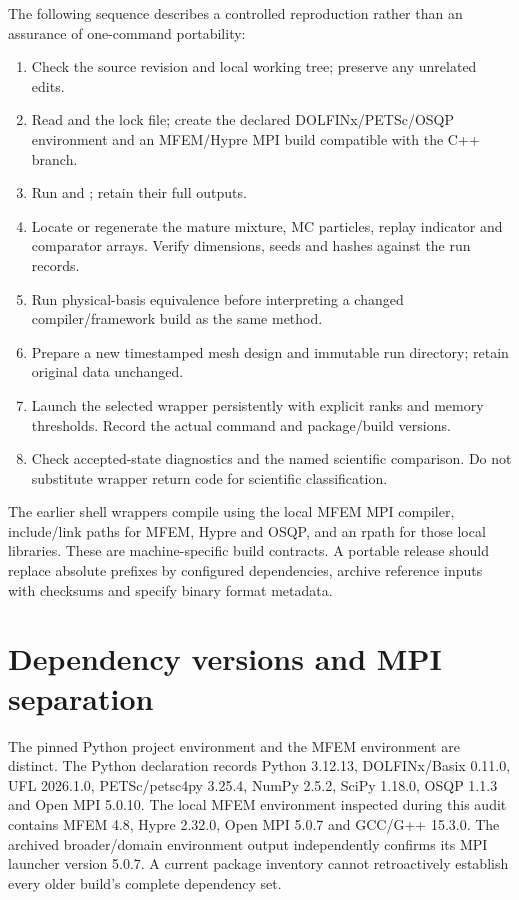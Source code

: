The following sequence describes a controlled reproduction rather than an assurance of one-command portability:
\begin{enumerate}
\item Check the source revision and local working tree; preserve any unrelated edits.
\item Read  and the lock file; create the declared DOLFINx/PETSc/OSQP environment and an MFEM/Hypre MPI build compatible with the C++ branch.
\item Run  and ; retain their full outputs.
\item Locate or regenerate the mature mixture, MC particles, replay indicator and comparator arrays. Verify dimensions, seeds and hashes against the run records.
\item Run physical-basis equivalence before interpreting a changed compiler/framework build as the same method.
\item Prepare a new timestamped mesh design and immutable run directory; retain original data unchanged.
\item Launch the selected wrapper persistently with explicit ranks and memory thresholds. Record the actual command and package/build versions.
\item Check accepted-state diagnostics and the named scientific comparison. Do not substitute wrapper return code for scientific classification.
\end{enumerate}

The earlier shell wrappers compile using the local MFEM MPI compiler, include/link paths for MFEM, Hypre and OSQP, and an rpath for those local libraries. These are machine-specific build contracts. A portable release should replace absolute prefixes by configured dependencies, archive reference inputs with checksums and specify binary format metadata.

\section{Dependency versions and MPI separation}
The pinned Python project environment and the MFEM environment are distinct. The Python declaration records Python 3.12.13, DOLFINx/Basix 0.11.0, UFL 2026.1.0, PETSc/petsc4py 3.25.4, NumPy 2.5.2, SciPy 1.18.0, OSQP 1.1.3 and Open MPI 5.0.10. The local MFEM environment inspected during this audit contains MFEM 4.8, Hypre 2.32.0, Open MPI 5.0.7 and GCC/G++ 15.3.0. The archived broader/domain environment output independently confirms its MPI launcher version 5.0.7. A current package inventory cannot retroactively establish every older build's complete dependency set.

